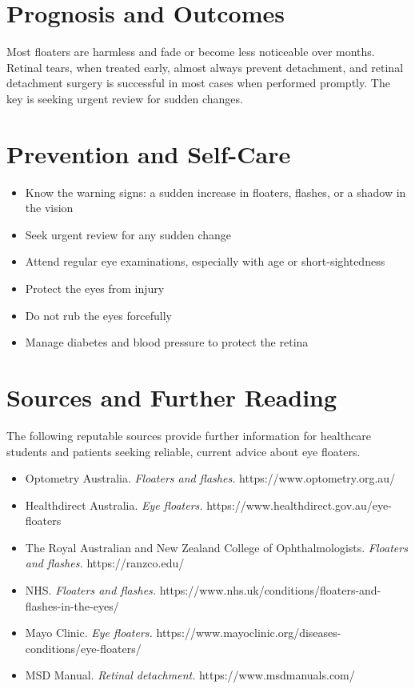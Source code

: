 \section*{Prognosis and Outcomes}
Most floaters are harmless and fade or become less noticeable over months. Retinal tears, when treated early, almost always prevent detachment, and retinal detachment surgery is successful in most cases when performed promptly. The key is seeking urgent review for sudden changes.

\section*{Prevention and Self-Care}
\begin{itemize}
    \item Know the warning signs: a sudden increase in floaters, flashes, or a shadow in the vision
    \item Seek urgent review for any sudden change
    \item Attend regular eye examinations, especially with age or short-sightedness
    \item Protect the eyes from injury
    \item Do not rub the eyes forcefully
    \item Manage diabetes and blood pressure to protect the retina
\end{itemize}

\section*{Sources and Further Reading}
The following reputable sources provide further information for healthcare students and patients seeking reliable, current advice about eye floaters.
\begin{itemize}
    \item Optometry Australia. \textit{Floaters and flashes.} https://www.optometry.org.au/
    \item Healthdirect Australia. \textit{Eye floaters.} https://www.healthdirect.gov.au/eye-floaters
    \item The Royal Australian and New Zealand College of Ophthalmologists. \textit{Floaters and flashes.} https://ranzco.edu/
    \item NHS. \textit{Floaters and flashes.} https://www.nhs.uk/conditions/floaters-and-flashes-in-the-eyes/
    \item Mayo Clinic. \textit{Eye floaters.} https://www.mayoclinic.org/diseases-conditions/eye-floaters/
    \item MSD Manual. \textit{Retinal detachment.} https://www.msdmanuals.com/
\end{itemize}
